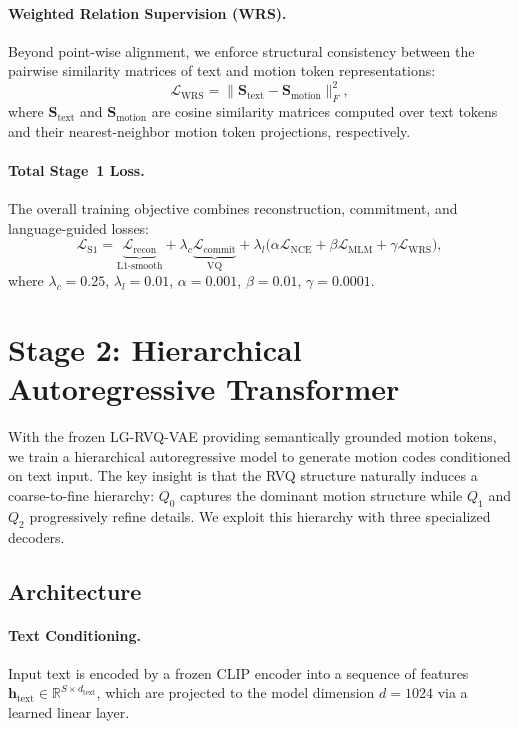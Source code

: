 \documentclass[10pt,twocolumn]{article}
\begin{document}
\paragraph{Weighted Relation Supervision (WRS).}
Beyond point-wise alignment, we enforce structural consistency between the pairwise similarity matrices of text and motion token representations:
\begin{equation}
    \mathcal{L}_{\text{WRS}} = \| \mathbf{S}_\text{text} - \mathbf{S}_\text{motion} \|_F^2,
\end{equation}
where $\mathbf{S}_\text{text}$ and $\mathbf{S}_\text{motion}$ are cosine similarity matrices computed over text tokens and their nearest-neighbor motion token projections, respectively.

\paragraph{Total Stage~1 Loss.}
The overall training objective combines reconstruction, commitment, and language-guided losses:
\begin{equation}
    \mathcal{L}_{\text{S1}} = \underbrace{\mathcal{L}_{\text{recon}}}_{\text{L1-smooth}} + \lambda_c \underbrace{\mathcal{L}_{\text{commit}}}_{\text{VQ}} + \lambda_l \big(\alpha \mathcal{L}_{\text{NCE}} + \beta \mathcal{L}_{\text{MLM}} + \gamma \mathcal{L}_{\text{WRS}}\big),
    \label{eq:stage1_loss}
\end{equation}
where $\lambda_c{=}0.25$, $\lambda_l{=}0.01$, $\alpha{=}0.001$, $\beta{=}0.01$, $\gamma{=}0.0001$.

\section{Stage 2: Hierarchical Autoregressive Transformer}
\label{sec:stage2}

With the frozen LG-RVQ-VAE providing semantically grounded motion tokens, we train a hierarchical autoregressive model to generate motion codes conditioned on text input. The key insight is that the RVQ structure naturally induces a coarse-to-fine hierarchy: $Q_0$ captures the dominant motion structure while $Q_1$ and $Q_2$ progressively refine details. We exploit this hierarchy with three specialized decoders.

\subsection{Architecture}

\paragraph{Text Conditioning.}
Input text is encoded by a frozen CLIP encoder into a sequence of features $\mathbf{h}_\text{text} \in \mathbb{R}^{S \times d_\text{text}}$, which are projected to the model dimension $d{=}1024$ via a learned linear layer.
\end{document}
